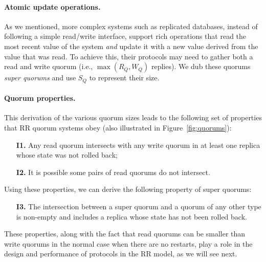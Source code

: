 \paragraph{Atomic update operations.}
As we mentioned, more complex systems such as replicated databases,
instead of following a simple read/write interface,
support rich operations that read the most recent value
of the system \emph{and} update it with a new value derived from
the value that was read. To achieve
this, their protocols may need to gather both a read and write quorum (i.e.,
$\max(R_Q, W_Q)$ replies). We dub these quorums \emph{super quorums}
and use $S_Q$ to represent their size.

\paragraph{Quorum properties.} This derivation of the various quorum
sizes leads to the following set of properties that \ac{RR} quorum
systems obey (also illustrated in Figure~\ref{fig:quorums}):

\begin{enumerate}
    \item[\textbf{I1.}] Any read quorum intersects with any write quorum in at least one replica whose state was not rolled back;
    \item[\textbf{I2.}] It is possible some pairs of read quorums do not intersect.
\end{enumerate}

Using these properties, we can derive the following
property of super quorums:

\begin{enumerate}
    \item[\textbf{I3.}] The intersection between a super
        quorum and a quorum of any other type is non-empty and includes a replica whose state
        has not been rolled back.
\end{enumerate}

These properties, along with the fact that read quorums can be
smaller than write quorums in the normal case when there
are no restarts, play a role in the design and performance of
protocols in the \ac{RR} model, as we will see next.

